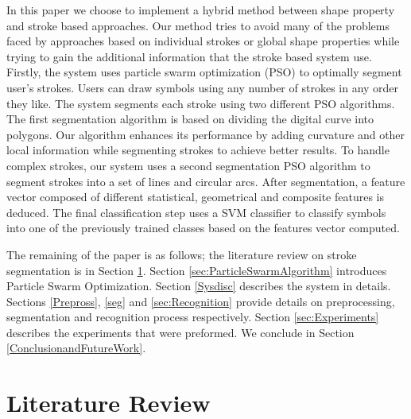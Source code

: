 \documentclass{article}
\begin{document}
In this paper we choose to implement a hybrid method between shape property and stroke based approaches. Our method tries to avoid many of the problems faced by approaches based on individual strokes or global shape properties while trying to gain the additional information that the stroke based system use. Firstly, the system uses particle swarm optimization (PSO) to optimally segment user's strokes. Users can draw symbols using any number of strokes in any order they like. The system segments each stroke using two different PSO algorithms. The first segmentation algorithm is based on dividing the digital curve into polygons\cite{PolygonApproximationPSO}. Our algorithm enhances its performance by adding curvature and other local information while segmenting strokes to achieve better results. To handle complex strokes, our system uses a second segmentation PSO algorithm to segment strokes into a set of lines and circular arcs. After segmentation, a feature vector composed of different statistical, geometrical and composite features is deduced. The final classification step uses a SVM classifier to classify symbols into one of the previously trained classes based on the features vector computed.



 The remaining of the paper is as follows; the literature review on stroke segmentation is in Section \ref{sec:review}. Section \ref{sec:ParticleSwarmAlgorithm} introduces Particle Swarm Optimization. Section \ref{Sysdisc} describes the system in details.  Sections \ref{Prepross}, \ref{seg} and \ref{sec:Recognition} provide details on preprocessing, segmentation and recognition process respectively. Section \ref{sec:Experiments} describes the experiments that were preformed. We conclude in Section \ref{ConclusionandFutureWork}.  

\section{Literature Review}
\label{sec:review}
\end{document}
